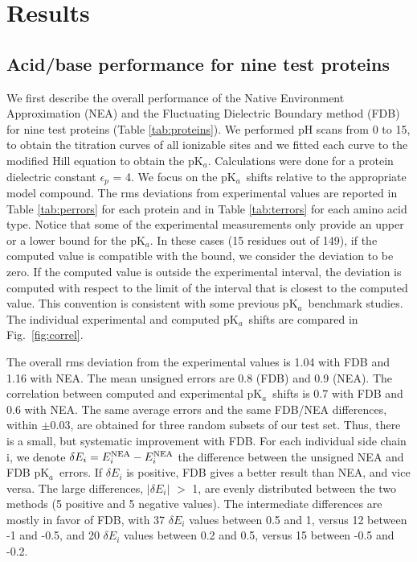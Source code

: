 \documentclass[a4paper,12pt]{article}
\newcommand{\pk}{pK$_a$}
\begin{document}
\section{Results}
\subsection{Acid/base performance for nine test proteins}
We first describe the overall performance of the Native Environment Approximation (NEA) and the
Fluctuating Dielectric Boundary method (FDB) for nine test proteins (Table \ref{tab:proteins}). We
performed pH scans from 0 to 15, to obtain the titration curves of all ionizable sites and we fitted
each curve to the modified Hill equation to obtain the \pk. Calculations were done for a protein
dielectric constant $\epsilon_p$ = 4. We focus on the \pk\ shifts relative to the appropriate model
compound. The rms deviations from experimental values are reported in Table \ref{tab:perrors} for
each protein and in Table \ref{tab:terrors} for each amino acid type. Notice that some of the
experimental measurements only provide an upper or a lower bound for the \pk. In these cases (15
residues out of 149), if the computed value is compatible with the bound, we consider the deviation
to be zero. If the computed value is outside the experimental interval, the deviation is computed
with respect to the limit of the interval that is closest to the computed value. This convention
is consistent with some previous \pk\ benchmark studies. The individual experimental and computed
\pk\ shifts are compared in Fig.\ \ref{fig:correl}. 

The overall rms deviation from the experimental values is 1.04 with FDB and 1.16 with NEA. The mean
unsigned errors are 0.8 (FDB) and 0.9 (NEA). The correlation between computed and experimental \pk\
shifts is 0.7 with FDB and 0.6 with NEA. The same average errors and the same FDB/NEA differences,
within $\pm$0.03, are obtained for three random subsets of our test set. Thus, there is a small, but
systematic improvement with FDB. For each individual side chain i, we denote $\delta E_i = E_i^{\rm NEA}
- E_i^{\rm NEA}$ the difference between the unsigned NEA and FDB \pk\ errors. If $\delta E_i$ is positive,
FDB gives a better result than NEA, and vice versa. The large differences, $|\delta E_i|$ $>$ 1, are
evenly distributed between the two methods (5 positive and 5 negative values). The intermediate differences
are mostly in favor of FDB, with 37 $\delta E_i$ values between 0.5 and 1, versus 12 between -1 and
-0.5, and 20 $\delta E_i$ values between 0.2 and 0.5, versus 15 between -0.5 and -0.2.
\end{document}

